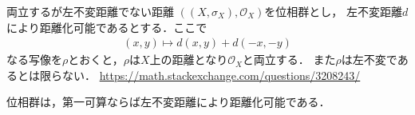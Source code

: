 	\begin{itembox}[l]{両立するが左不変距離でない距離}
		$\left(\left(X,\sigma_X\right),\mathscr{O}_X\right)$を位相群とし，
		左不変距離$d$により距離化可能であるとする．ここで
		\begin{align}
			(x,y) \longmapsto d(x,y) + d(-x,-y)
		\end{align}
		なる写像を$\rho$とおくと，$\rho$は$X$上の距離となり$\mathscr{O}_X$と両立する．
		また$\rho$は左不変であるとは限らない．
		\url{https://math.stackexchange.com/questions/3208243/}
	\end{itembox}
	
	\begin{screen}
		\begin{thm}
			位相群は，第一可算ならば左不変距離により距離化可能である．
		\end{thm}
	\end{screen}
	